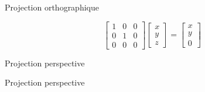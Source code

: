 \documentclass[compress]{beamer}
\begin{document}
\begin{frame}{Projection orthographique}
    \begin{center}

\[
\begin{bmatrix} 1 & 0 & 0 \\ 
                0 & 1 & 0 \\
                0 & 0 & 0
\end{bmatrix} \begin{bmatrix} x \\ y \\ z \end{bmatrix}
= \begin{bmatrix} x \\ y \\ 0 \end{bmatrix} 
\]



\end{center}
\end{frame}

\begin{frame}{Projection perspective}
    \begin{center}
    

    \end{center}
\end{frame}

\begin{frame}{Projection perspective}
    \begin{center}
    

    \end{center}
\end{frame}
\end{document}
